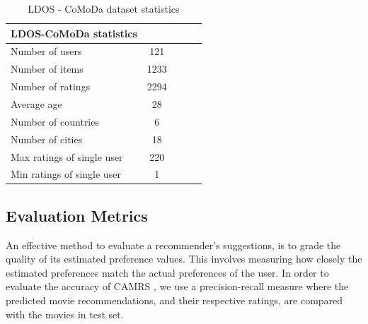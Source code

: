 \documentclass{article}
\begin{document}
\begin{table} [H]
	\caption{LDOS - CoMoDa dataset statistics}
	\label{ldos}
	\vskip 0.15in      
	\begin{center}
	\begin{small}
	\begin{sc}
    \begin{tabular}{lcccr}
	\hline
	\abovespace\belowspace
	LDOS-CoMoDa statistics\\
    \hline
    \abovespace
    Number of users            & 121 \\
    Number of items            & 1233  \\
    Number of ratings          & 2294  \\
    Average age                & 28  \\
    Number of countries        & 6  \\
    Number of cities           & 18  \\
    Max ratings of single user & 220  \\
    \belowspace
	Min ratings of single user & 1  \\
	\hline
	\end{tabular}
	\end{sc}
	\end{small}
	\end{center}
	\vskip -0.1in
\end{table}

\subsection{Evaluation Metrics}
An effective method to evaluate a recommender's suggestions, is to grade the quality of its estimated preference values. This involves measuring how closely the estimated preferences match the actual preferences of the user. In order to evaluate the accuracy of CAMRS , we use a precision-recall measure where the predicted movie recommendations, and their respective ratings, are compared with the movies in test set. \\
\end{document}
